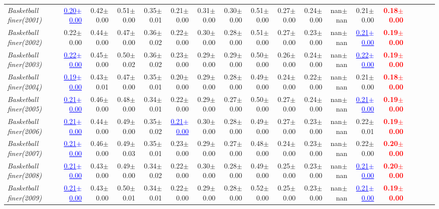 \documentclass[nohyperref]{article}
\theoremstyle{plain}
\theoremstyle{definition}
\theoremstyle{remark}
\newcommand{\red}[1]{\textcolor{red}{\textbf{#1}}}
\newcommand{\blue}[1]{\textcolor{blue}{\underline{#1}}}
\begin{document}
\begin{table*}[!ht]
{\begin{tabular}{lrrrrrrrrrrrrrrrrr}
			{\it Basketball finer(2001)} & \blue{0.20$\pm$0.00} & 0.42$\pm$0.00 & 0.51$\pm$0.00 & 0.35$\pm$0.01 & 0.21$\pm$0.00 & 0.31$\pm$0.00 & 0.30$\pm$0.00 & 0.51$\pm$0.00 & 0.27$\pm$0.00 & 0.24$\pm$0.00 & nan$\pm$nan & 0.21$\pm$0.00 & \red{0.18$\pm$0.00} \\
			{\it Basketball finer(2002)} & 0.22$\pm$0.00 & 0.44$\pm$0.00 & 0.47$\pm$0.00 & 0.36$\pm$0.02 & 0.22$\pm$0.00 & 0.30$\pm$0.00 & 0.28$\pm$0.00 & 0.51$\pm$0.00 & 0.27$\pm$0.00 & 0.23$\pm$0.00 & nan$\pm$nan & \blue{0.21$\pm$0.00} & \red{0.19$\pm$0.00} \\
			{\it Basketball finer(2003)} & \blue{0.22$\pm$0.00} & 0.45$\pm$0.00 & 0.50$\pm$0.02 & 0.36$\pm$0.02 & 0.23$\pm$0.00 & 0.29$\pm$0.00 & 0.29$\pm$0.00 & 0.50$\pm$0.00 & 0.26$\pm$0.00 & 0.24$\pm$0.00 & nan$\pm$nan & \blue{0.22$\pm$0.00} & \red{0.19$\pm$0.00} \\
			{\it Basketball finer(2004)} & \blue{0.19$\pm$0.00} & 0.43$\pm$0.01 & 0.47$\pm$0.00 & 0.35$\pm$0.01 & 0.20$\pm$0.00 & 0.29$\pm$0.00 & 0.28$\pm$0.00 & 0.49$\pm$0.00 & 0.24$\pm$0.00 & 0.22$\pm$0.00 & nan$\pm$nan & 0.21$\pm$0.00 & \red{0.18$\pm$0.00} \\
			{\it Basketball finer(2005)} & \blue{0.21$\pm$0.00} & 0.46$\pm$0.00 & 0.48$\pm$0.00 & 0.34$\pm$0.01 & 0.22$\pm$0.00 & 0.29$\pm$0.00 & 0.27$\pm$0.00 & 0.50$\pm$0.00 & 0.27$\pm$0.00 & 0.24$\pm$0.00 & nan$\pm$nan & \blue{0.21$\pm$0.00} & \red{0.19$\pm$0.00} \\
			{\it Basketball finer(2006)} & \blue{0.21$\pm$0.00} & 0.44$\pm$0.00 & 0.49$\pm$0.00 & 0.35$\pm$0.02 & \blue{0.21$\pm$0.00} & 0.30$\pm$0.00 & 0.28$\pm$0.00 & 0.49$\pm$0.00 & 0.27$\pm$0.00 & 0.23$\pm$0.00 & nan$\pm$nan & 0.22$\pm$0.01 & \red{0.19$\pm$0.00} \\
			{\it Basketball finer(2007)} & \blue{0.21$\pm$0.00} & 0.46$\pm$0.00 & 0.49$\pm$0.03 & 0.35$\pm$0.01 & 0.23$\pm$0.00 & 0.29$\pm$0.00 & 0.27$\pm$0.00 & 0.48$\pm$0.00 & 0.24$\pm$0.00 & 0.23$\pm$0.00 & nan$\pm$nan & 0.22$\pm$0.00 & \red{0.20$\pm$0.00} \\
			{\it Basketball finer(2008)} & \blue{0.21$\pm$0.00} & 0.43$\pm$0.00 & 0.49$\pm$0.00 & 0.34$\pm$0.02 & 0.22$\pm$0.00 & 0.30$\pm$0.00 & 0.28$\pm$0.00 & 0.49$\pm$0.00 & 0.25$\pm$0.00 & 0.23$\pm$0.00 & nan$\pm$nan & \blue{0.21$\pm$0.00} & \red{0.20$\pm$0.00} \\
			{\it Basketball finer(2009)} & \blue{0.21$\pm$0.00} & 0.43$\pm$0.00 & 0.50$\pm$0.01 & 0.34$\pm$0.01 & 0.22$\pm$0.00 & 0.29$\pm$0.00 & 0.28$\pm$0.00 & 0.52$\pm$0.00 & 0.25$\pm$0.00 & 0.23$\pm$0.00 & nan$\pm$nan & \blue{0.21$\pm$0.00} & \red{0.19$\pm$0.00} \\

\end{tabular}}
\end{table*}
\end{document}
